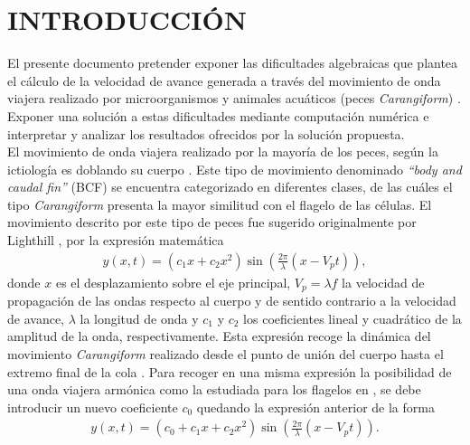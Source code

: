 \section{INTRODUCCIÓN} \label{sec:Introduccion}
El presente documento pretender exponer las dificultades algebraicas que plantea el cálculo de la velocidad de avance generada a través del movimiento de onda viajera realizado por microorganismos \cite{Gray1955} y animales acuáticos (peces \textit{Carangiform}) \cite{Korkmaz2012,Korkmaz2011}. Exponer una solución a estas dificultades mediante computación numérica e interpretar y analizar los resultados ofrecidos por la solución propuesta.\\

El movimiento de onda viajera realizado por la mayoría de los peces, según la ictiología es doblando su cuerpo \cite{Sfakiotakis1998}. Este tipo de movimiento denominado \textit{``body and caudal fin''} (BCF) se encuentra categorizado en diferentes clases, de las cuáles el tipo \textit{Carangiform}  presenta la mayor similitud con el flagelo de las células. El movimiento descrito por este tipo de peces fue sugerido originalmente por Lighthill \cite{Mj1960}, por la expresión matemática \cite{Mj1960}
\begin{eqnarray}
	\label{eq:fish_traveling_wave}
	y (x,t) = (c_1 x + c_2 x^2) \sin \left( \frac{2 \pi}{\lambda}  ( x - V_p t) \right),
\end{eqnarray}
donde $x$ es el desplazamiento sobre el eje principal, $V_p = \lambda f$ la velocidad de propagación de las ondas respecto al cuerpo y de sentido contrario a la velocidad de avance, $\lambda$ la longitud de onda y $c_1$ y $c_2$ los coeficientes lineal y cuadrático de la amplitud de la onda, respectivamente. Esta expresión recoge la dinámica del movimiento \textit{Carangiform} realizado desde el punto de unión del cuerpo hasta el extremo final de la cola \cite{Korkmaz2012, Korkmaz2011,Liu2004}. Para recoger en una misma expresión la posibilidad de una onda viajera armónica como la estudiada para los flagelos en \cite{Gray1955}, se debe introducir un nuevo coeficiente $c_0$ quedando la expresión anterior de la forma
\begin{eqnarray}
	\label{eq:flag_fish_traveling_wave}
	y (x,t) = (c_0+c_1 x + c_2 x^2) \sin \left( \frac{2 \pi}{\lambda}  ( x - V_p t) \right).
\end{eqnarray}

